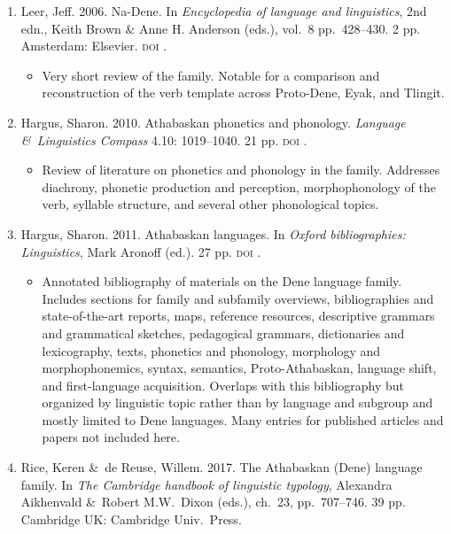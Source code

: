 \documentclass[12pt,letterpaper,oneside,article]{memoir}
\begin{document}
\begin{enumerate}
\begin{itemize}
	\end{itemize}
\item	Leer, Jeff.
	2006.
	Na-Dene.
	In \textit{Encyclopedia of language and linguistics}, 2nd edn.,
	Keith Brown \& Anne H. Anderson (eds.), vol.\ 8 pp.\ 428–430.
	2 pp.
	Amsterdam: Elsevier.
	\textsc{doi} .
	\begin{itemize}
	\item	Very short review of the family.
		Notable for a comparison and reconstruction of the verb template
		across Proto-Dene, Eyak, and Tlingit.
	\end{itemize}
\item	Hargus, Sharon.
	2010.
	Athabaskan phonetics and phonology.
	\textit{Language \&\ Linguistics Compass} 4.10: 1019–1040.
	21 pp.
	\textsc{doi} .
	\begin{itemize}
	\item	Review of literature on phonetics and phonology in the family.
		Addresses diachrony, phonetic production and perception,
		morphophonology of the verb, syllable structure, and
		several other phonological topics.
	\end{itemize}
\item	Hargus, Sharon.
	2011.
	Athabaskan languages.
	In \textit{Oxford bibliographies: Linguistics},
	Mark Aronoff (ed.).
	27 pp.
	\textsc{doi} .
	\begin{itemize}
	\item	Annotated bibliography of materials on the Dene language family.
		Includes sections for family and subfamily overviews, bibliographies
		and state-of-the-art reports, maps, reference resources, descriptive
		grammars and grammatical sketches, pedagogical grammars, dictionaries and
		lexicography, texts, phonetics and phonology, morphology and morphophonemics,
		syntax, semantics, Proto-Athabaskan, language shift, and first-language
		acquisition.
		Overlaps with this bibliography but organized by linguistic topic rather
		than by language and subgroup and mostly limited to Dene languages.
		Many entries for published articles and papers not included here.
	\end{itemize}
\item	Rice, Keren \&\ de Reuse, Willem.
	2017.
	The Athabaskan (Dene) language family.
	In \textit{The Cambridge handbook of linguistic typology},
	Alexandra Aikhenvald \&\ Robert M.W.\ Dixon (eds.),
	ch.\ 23, pp.\ 707–746.
	39 pp.
	Cambridge UK: Cambridge Univ.\ Press.

\end{enumerate}
\end{document}
